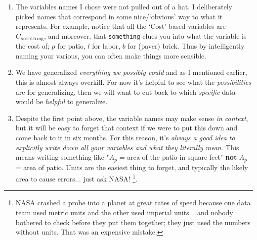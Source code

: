 \documentclass{ximeraXloud}
\begin{document}
\begin{exploration}
    \begin{enumerate}
        \item The variables names I chose were not pulled out of a hat. I deliberately picked names that correspond in some nice/`obvious' way to what it represents. For example, notice that all the `Cost' based variables are $C_{\texttt{something}}$, and moreover, that \texttt{something} clues you into what the variable is the cost of; $p$ for patio, $l$ for labor, $b$ for (paver) brick. Thus by intelligently naming your various, you can often make things more sensible.
        \item We have generalized \textit{everything we possibly could} and as I mentioned earlier, this is almost always overkill. For now it's helpful to see what the \textit{possibilities} are for generalizing, then we will want to cut back to which \textit{specific} data would be \textit{helpful} to generalize.
        \item Despite the first point above, the variable names may make sense \textit{in context}, but it will be easy to forget that context if we were to put this down and come back to it in six months. For this reason, it's \textit{always a good idea to explicitly write down all your variables and what they literally mean}. This means writing something like "$A_p$ = area of the patio in square feet" \textbf{not} $A_p$ = area of patio. Units are the easiest thing to forget, and typically the  likely area to cause errors... just ask NASA!%
        \footnote{NASA crashed a probe into a planet at great rates of speed because one data team used metric units and the other used imperial units... and nobody bothered to check before they put them together; they just used the numbers without units. That was an expensive mistake.}.
    \end{enumerate}
\end{exploration}
\end{document}
